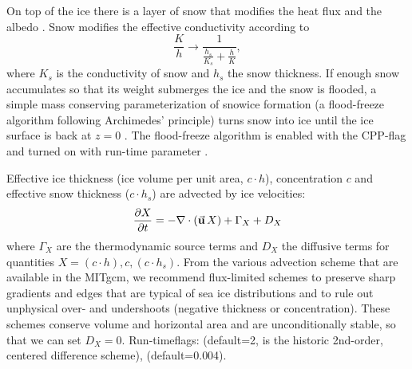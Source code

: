 On top of the ice there is a layer of snow that modifies the heat flux
and the albedo \citep{zha98a}. Snow modifies the effective
conductivity according to 
\[\frac{K}{h} \rightarrow \frac{1}{\frac{h_{s}}{K_{s}}+\frac{h}{K}},\]
where $K_s$ is the conductivity of snow and $h_s$ the snow thickness.
If enough snow accumulates so that its weight submerges the ice and
the snow is flooded, a simple mass conserving parameterization of
snowice formation (a flood-freeze algorithm following Archimedes'
principle) turns snow into ice until the ice surface is back at $z=0$
\citep{leppaeranta83}. The flood-freeze algorithm is enabled with the CPP-flag
 and turned on with run-time parameter
.

Effective ice thickness (ice volume per unit area,
$c\cdot{h}$), concentration $c$ and effective snow thickness
($c\cdot{h}_{s}$) are advected by ice velocities:
\begin{equation}
  \label{eq:advection}
  \frac{\partial{X}}{\partial{t}} = - \nabla\cdot\left(\vek{u}\,X\right) +
  \Gamma_{X} + D_{X}
\end{equation}
where $\Gamma_X$ are the thermodynamic source terms and $D_{X}$ the
diffusive terms for quantities $X=(c\cdot{h}), c, (c\cdot{h}_{s})$.
%
From the various advection scheme that are available in the MITgcm, we
recommend flux-limited schemes \citep[multidimensional 2nd and
3rd-order advection scheme with flux limiter][]{roe:85, hundsdorfer94}
to preserve sharp gradients and edges that are typical of sea ice
distributions and to rule out unphysical over- and undershoots
(negative thickness or concentration). These schemes conserve volume
and horizontal area and are unconditionally stable, so that we can set
$D_{X}=0$. Run-timeflags:  (default=2, is the
historic 2nd-order, centered difference scheme), 
(default=0.004).

